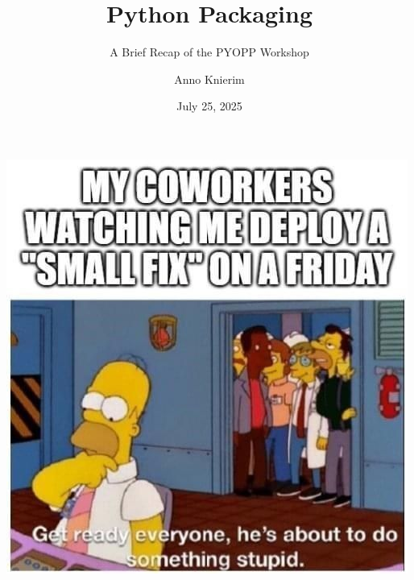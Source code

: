 \documentclass[aspectratio=1610, 9pt]{beamer}
\title{Python Packaging}
\subtitle{A Brief Recap of the PYOPP Workshop}
\author[A.~Knierim]{Anno Knierim}
\date{July 25, 2025}
\begin{document}
\maketitle








\begin{frame}
  \begin{center}
    \includegraphics[height=0.75\textheight]{graphics/homer.jpg}
  \end{center}
\end{frame}
\end{document}
